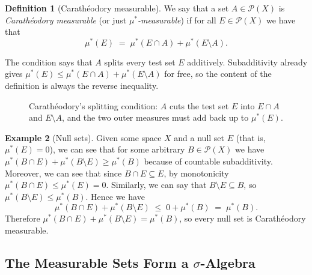 \documentclass[11pt]{article}
\theoremstyle{definition}
\newtheorem{definition}{Definition}[section]
\newtheorem{example}[definition]{Example}
\theoremstyle{plain}
\newcommand{\Pow}{\mathcal{P}}
\newcommand{\ostar}{\mu^{*}}
\begin{document}
\begin{definition}[Carath\'eodory measurable]
We say that a set $A \in \Pow(X)$ is \emph{Carath\'eodory measurable}
(or just \emph{$\ostar$-measurable}) if for all $E \in \Pow(X)$ we have
that
\[
  \ostar(E) \;=\; \ostar(E \cap A) + \ostar(E \setminus A).
\]
\end{definition}

The condition says that $A$ splits every test set $E$ additively.
Subadditivity already gives $\ostar(E) \le \ostar(E \cap A) +
\ostar(E \setminus A)$ for free, so the content of the definition is
always the reverse inequality.

\begin{figure}[H]
\centering
{}
\caption{Carath\'eodory's splitting condition: $A$ cuts the test set
$E$ into $E \cap A$ and $E \setminus A$, and the two outer measures
must add back up to $\ostar(E)$.}
\end{figure}

\begin{example}[Null sets]
Given some space $X$ and a null set $E$ (that is, $\ostar(E) = 0$), we
can see that for some arbitrary $B \in \Pow(X)$ we have
$\ostar(B \cap E) + \ostar(B \setminus E) \ge \ostar(B)$ because of
countable subadditivity. Moreover, we can see that since
$B \cap E \subseteq E$, by monotonicity $\ostar(B \cap E) \le
\ostar(E) = 0$. Similarly, we can say that $B \setminus E \subseteq B$,
so $\ostar(B \setminus E) \le \ostar(B)$. Hence we have
\[
  \ostar(B \cap E) + \ostar(B \setminus E)
    \;\le\; 0 + \ostar(B) \;=\; \ostar(B).
\]
Therefore $\ostar(B \cap E) + \ostar(B \setminus E) = \ostar(B)$, so
every null set is Carath\'eodory measurable.
\end{example}

\subsection{The Measurable Sets Form a \texorpdfstring{$\sigma$}{sigma}-Algebra}
\end{document}
